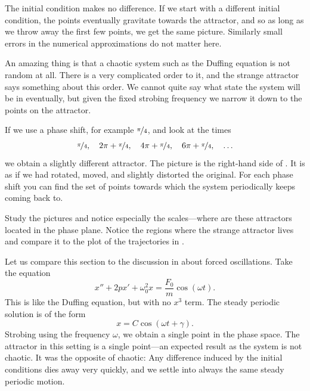 The initial condition makes no difference.  If
we start with a different initial condition, the points eventually
gravitate towards the attractor, and so as long as we throw away the first
few points, we get the same picture.
Similarly small errors in the numerical approximations do not matter here.

An amazing thing is that a chaotic system such as the Duffing equation is
not random at all.  There is a very complicated order to it, and the strange
attractor says something about this order.  We cannot quite say what state
the system will be in eventually, but given the fixed strobing frequency we
narrow it down to the points on the attractor.

If we use a phase shift, for example $\nicefrac{\pi}{4}$, and look at the
times
\begin{equation*}
\nicefrac{\pi}{4}, \quad
2\pi+\nicefrac{\pi}{4}, \quad
4\pi+\nicefrac{\pi}{4}, \quad
6\pi+\nicefrac{\pi}{4}, \quad
\ldots
\end{equation*}
we obtain a slightly different attractor.
The picture is the right-hand side of 
.
It is as if we had
rotated, moved, and slightly distorted the original.
For each phase shift you can find the
set of points towards which the system periodically keeps coming back to.

Study the pictures and notice especially the scales---where are
these attractors located in the phase plane.  Notice the
regions where the strange attractor lives and compare it to the plot of the
trajectories in .

Let us
compare this section to the discussion in  about forced
oscillations.  Take the equation
\begin{equation*}
x''+2p x' + \omega_0^2 x = \frac{F_0}{m} \cos (\omega t) .
\end{equation*}
This is like the Duffing equation, but with no $x^3$ term.
The steady periodic solution is of the form
\begin{equation*}
x = C \cos (\omega t + \gamma) .
\end{equation*}
Strobing using the frequency $\omega$, we obtain a single point in the
phase space.  The attractor in this setting is a single point---an
expected result as the system is not chaotic.  It was the opposite
of chaotic:  Any difference induced by the initial conditions dies away very
quickly, and we settle into always the same steady periodic motion.


